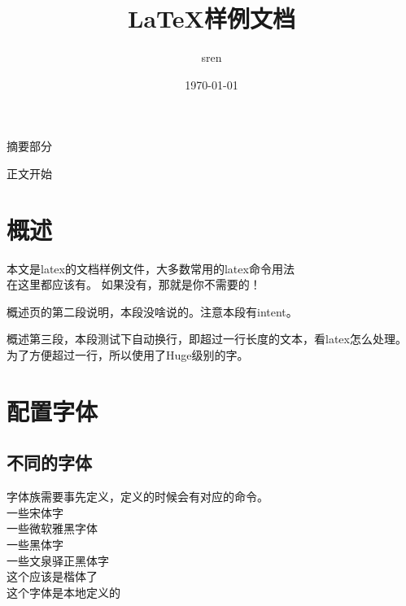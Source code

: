 \documentclass[a4paper,12pt]{article} %
\title{LaTeX样例文档}
\author{sren}
\date{\today}
\begin{document}
\maketitle
\thispagestyle{empty} %


\newpage
{}
摘要部分


\newpage
\tableofcontents
\newpage
\listoffigures
\newpage
\listoftables

\newpage %
 正文开始
 \section{概述}
 本文是latex的文档样例文件，大多数常用的latex命令用法\\在这里都应该有。
 如果没有，那就是你不需要的！

  概述页的第二段说明，本段没啥说的。注意本段有intent。

  {\Huge 概述第三段，本段测试下自动换行，即超过一行长度的文本，看latex怎么处理。为了方便超过一行，所以使用了Huge级别的字。}
  \pagebreak

 
 \section[pz字体]{配置字体} %
 \subsection{不同的字体}
 字体族需要事先定义，定义的时候会有对应的命令。\\
 {\song 一些宋体字}\\ %
 {\yahei 一些微软雅黑字体}\\
 {\hei 一些黑体字}\\
 {\zhei 一些文泉驿正黑体字}\\
 {\kai 这个应该是楷体了}\\
 { 这个字体是本地定义的}
\end{document}

